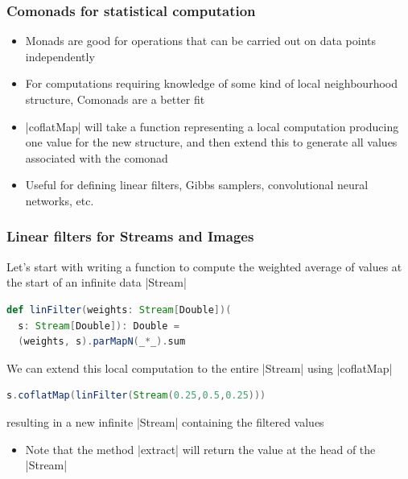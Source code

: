 \documentclass[mathserif,handout]{beamer}
\begin{document}
\begin{frame}[fragile]
  \frametitle{Comonads for statistical computation}
  \begin{itemize}
  \item Monads are good for operations that can be carried out on data points independently
    \item For computations requiring knowledge of some kind of local neighbourhood structure, \alert{Comonads} are a better fit
    \item |coflatMap| will take a function representing a \alert{local computation} producing one value for the new structure, and then extend this to generate all values associated with the comonad
      \item Useful for defining linear filters, Gibbs samplers, convolutional neural networks, etc.
    \end{itemize}
\end{frame}

\begin{frame}[fragile]
\frametitle{Linear filters for Streams and Images}  
Let's start with writing a function to compute the weighted average of values at the start of an infinite data |Stream|
\begin{lstlisting}[language=scala]
def linFilter(weights: Stream[Double])(
  s: Stream[Double]): Double =
  (weights, s).parMapN(_*_).sum    
\end{lstlisting}
We can extend this \alert{local computation} to the entire |Stream| using |coflatMap|
\begin{lstlisting}[language=scala]
s.coflatMap(linFilter(Stream(0.25,0.5,0.25)))
\end{lstlisting}
resulting in a new infinite |Stream| containing the filtered values
\begin{itemize}
\item  Note that the method |extract| will return the value at the head of the |Stream|
  \end{itemize}
\end{frame}
\end{document}
